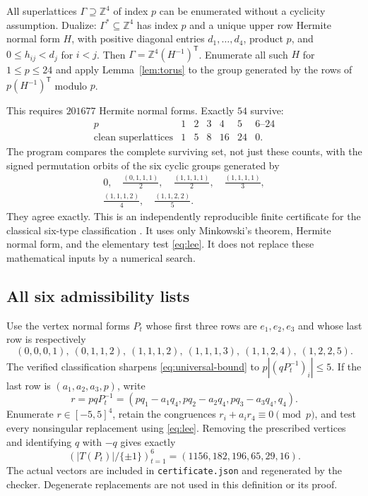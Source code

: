 \documentclass[11pt,reqno]{amsart}
\theoremstyle{definition}
\newcommand{\Z}{\mathbb Z}
\begin{document}
All superlattices $\Gamma\supseteq\Z^4$ of index $p$ can be enumerated
without a cyclicity assumption. Dualize: $\Gamma^*\subseteq\Z^4$ has
index $p$ and a unique upper row Hermite normal form $H$, with positive
diagonal entries $d_1,\ldots,d_4$, product $p$, and
$0\le h_{ij}<d_j$ for $i<j$. Then
$\Gamma=\Z^4(H^{-1})^{\mathsf T}$. Enumerate all such $H$ for
$1\le p\le24$ and apply Lemma~\ref{lem:torus} to the group generated
by the rows of $p(H^{-1})^{\mathsf T}$ modulo $p$.

This requires $201677$ Hermite normal forms. Exactly $54$ survive:
\[
\begin{array}{c|rrrrrr}
p&1&2&3&4&5&6\text{--}24\\\hline
\text{clean superlattices}&1&5&8&16&24&0.
\end{array}
\]
The program compares the complete surviving set, not just these counts,
with the signed permutation orbits of the six cyclic groups generated by
\[
\begin{gathered}
0,\quad \frac{(0,1,1,1)}2,\quad \frac{(1,1,1,1)}2,\quad
\frac{(1,1,1,1)}3,\\
\frac{(1,1,1,2)}4,\quad
\frac{(1,1,2,2)}5.
\end{gathered}
\]
They agree exactly. This is an independently reproducible finite
certificate for the classical six-type classification
\cite{Wolff,Mordell}. It uses only Minkowski's theorem, Hermite normal
form, and the elementary test \eqref{eq:lee}. It does not replace these
mathematical inputs by a numerical search.

\subsection{All six admissibility lists}
Use the vertex normal forms $P_t$ whose first three rows are $e_1,e_2,e_3$
and whose last row is respectively
\[
 (0,0,0,1),\ (0,1,1,2),\ (1,1,1,2),\ (1,1,1,3),\
 (1,1,2,4),\ (1,2,2,5).
\]
The verified classification sharpens \eqref{eq:universal-bound} to
$p|(qP_t^{-1})_i|\le5$. If the last row is $(a_1,a_2,a_3,p)$, write
\[
 r=pqP_t^{-1}=(pq_1-a_1q_4,pq_2-a_2q_4,pq_3-a_3q_4,q_4).
\]
Enumerate $r\in[-5,5]^4$, retain the congruences
$r_i+a_ir_4\equiv0\pmod p$, and test every nonsingular replacement
using \eqref{eq:lee}. Removing the prescribed vertices and identifying
$q$ with $-q$ gives exactly
\begin{equation}\label{eq:testcounts}
 (|T(P_t)|/\{\pm1\})_{t=1}^6=(1156,182,196,65,29,16).
\end{equation}
The actual vectors are included in \texttt{certificate.json} and regenerated
by the checker. Degenerate replacements are not used in this definition
or its proof.
\end{document}
